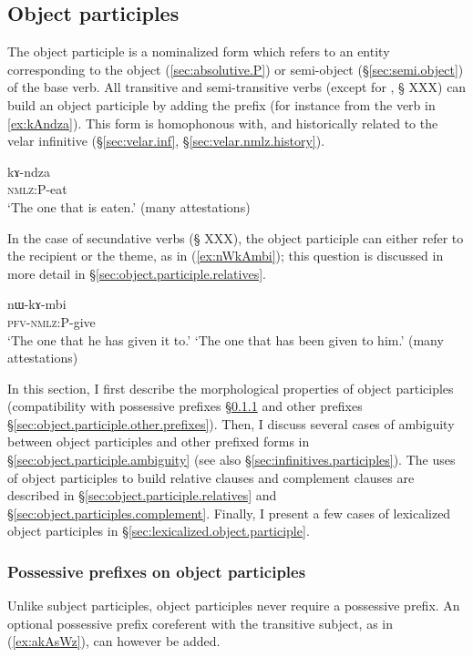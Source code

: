 \subsection{Object participles} \label{sec:object.participle}
The object participle is a nominalized form which refers to an entity corresponding to the object (\ref{sec:absolutive.P}) or semi-object (§\ref{sec:semi.object}) of the base verb. All transitive and semi-transitive verbs (except for , § XXX) can build an object participle by adding the prefix  (for instance  from the verb  in \ref{ex:kAndza}). This form is homophonous with, and historically related to the velar infinitive (§\ref{sec:velar.inf}, §\ref{sec:velar.nmlz.history}).

 \begin{exe} 
\ex \label{ex:kAndza}
\gll kɤ-ndza \\
   \textsc{nmlz}:P-eat \\
 \glt  `The one that is eaten.' (many attestations)
 \end{exe}

In the case of secundative verbs (§ XXX), the object participle can either refer to the recipient or the theme, as in (\ref{ex:nWkAmbi}); this question is discussed in more detail in §\ref{sec:object.participle.relatives}.

  \begin{exe} 
\ex \label{ex:nWkAmbi}
\gll nɯ-kɤ-mbi \\
   \textsc{pfv}-\textsc{nmlz}:P-give \\
 \glt  `The one that he has given it to.'
 \glt `The one that has been given to him.'  (many attestations)
 \end{exe}

   
 In this section, I first describe the morphological properties of object participles (compatibility with possessive prefixes §\ref{sec:object.participle.possessive} and other prefixes §\ref{sec:object.participle.other.prefixes}). Then, I discuss several cases of ambiguity between object participles and other  prefixed forms in §\ref{sec:object.participle.ambiguity} (see also §\ref{sec:infinitives.participles}). The uses of object participles to build relative clauses and complement clauses are described in  §\ref{sec:object.participle.relatives} and §\ref{sec:object.participles.complement}. Finally, I present a few cases of lexicalized object participles in §\ref{sec:lexicalized.object.participle}.
 
\subsubsection{Possessive prefixes on object participles}  \label{sec:object.participle.possessive} 
Unlike subject participles, object participles never require a possessive prefix. An optional possessive prefix coreferent with the transitive subject, as in (\ref{ex:akAsWz}), can however be added.
  
